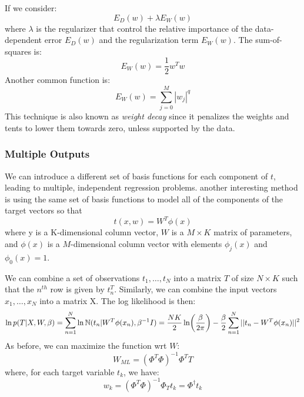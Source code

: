If we consider:
\begin{equation}
    E_{D}(w) + \lambda E_{W}(w)
\end{equation}
where $\lambda$ is the regularizer that control the relative importance of the data-dependent error $E_{D}(w)$ and the regularization term $E_{W}(w)$. The sum-of-squares is:
\begin{equation}
    E_{W}(w) = \frac{1}{2} w^{T}w
\end{equation}
Another common function is:
\begin{equation}
    E_{W}(w) = \sum_{j=0}^{M}|w_{j}|^{q}
\end{equation}
This technique is also known as \textit{weight decay} since it penalizes the weights and tents to lower them towards zero, unless supported by the data.

\subsubsection{Multiple Outputs}
We can introduce a different set of basis functions for each component of $t$, leading to multiple, independent regression problems. another interesting method is using the same set of basis functions to model all of the components of the target vectors so that
\begin{equation}
    t(x, w) = W^{T}\phi(x)
\end{equation}
where y is a K-dimensional column vector, $W$ is a $M \times K$ matrix of parameters, and $\phi(x)$ is a $M$-dimensional column vector with elements $\phi_{j}(x)$ and $\phi_{0}(x) = 1$.

We can combine a set of observations $t_{1}, \dots, t_{N}$ into a matrix $T$ of size $N \times K$ such that the $n^{th}$ row is given by $t_{n}^{T}$. Similarly, we can combine the input vectors $x_{1}, \dots, x_{N}$ into a matrix X. The log likelihood is then:
\begin{equation}
    \ln p(T|X, W, \beta) = \sum_{n=1}^{N}\ln \mathbb{N}(t_{n}|W^{T}\phi(x_{n}), \beta^{-1}I) = \\
    \frac{NK}{2} \ln (\frac{\beta}{2\pi}) - \frac{\beta}{2} \sum_{n=1}^{N} ||t_{n} - W^{T}\phi(x_{n})||^{2}
\end{equation}
As before, we can maximize the function wrt $W$:
\begin{equation}
    W_{ML} = (\Phi^{T}\Phi)^{-1}\Phi^{T}T
\end{equation}
where, for each target variable $t_{k}$, we have:
\begin{equation}
    w_{k} = (\Phi^{T}\Phi)^{-1}\Phi_{T}t_{k} = \Phi^{\dagger}t_{k}
\end{equation}